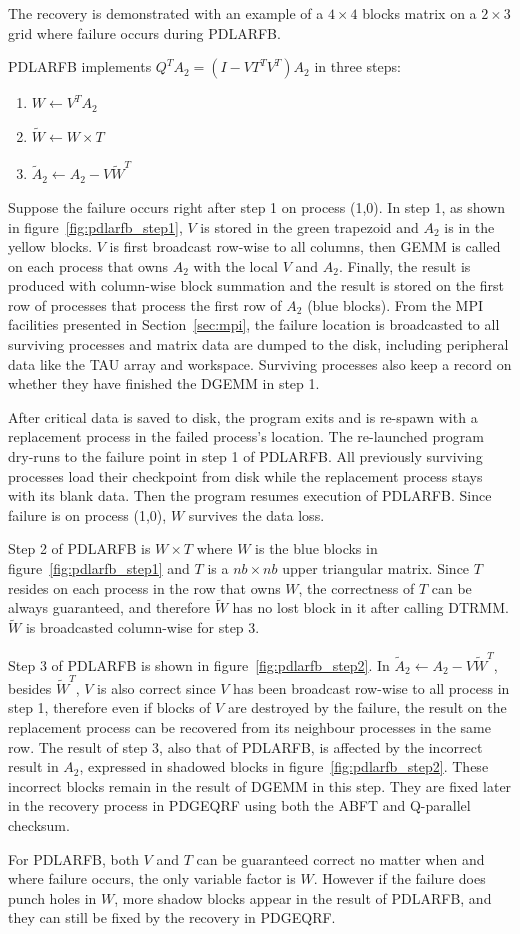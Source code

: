 The recovery is demonstrated with an example of a $4\times 4$ blocks
matrix on a $2\times 3$ grid where failure occurs during PDLARFB.

PDLARFB implements $Q^{T}A_{2}=(I-VT^{T}V^{T})A_{2}$ in three steps:
\begin{enumerate}
\item $W\leftarrow V^{T}A_{2}$
\item $\tilde{W}\leftarrow W\times T$
\item $\tilde{A}_{2}\leftarrow A_{2}-V\tilde{W}^{T}$
\end{enumerate}
Suppose the failure occurs right after step 1 on process (1,0). 
In step 1, as shown in figure~\ref{fig:pdlarfb_step1}, $V$ is stored
in the green trapezoid and $A_{2}$ is in the yellow blocks. $V$ is
first broadcast row-wise to all columns, then GEMM is called on each
process that owns $A_{2}$ with the local $V$ and $A_{2}$. Finally, the
result is produced with column-wise block summation and the result is
stored on the first row of processes that process the first row of
$A_{2}$ (blue blocks).  From the MPI facilities presented in
Section~\ref{sec:mpi}, the failure location is broadcasted to all 
surviving processes and matrix data are dumped to the disk, including
peripheral data like the TAU array and workspace. Surviving processes
also keep a record on whether they have finished the DGEMM in step 1.

After critical data is saved to disk, the program exits and is
re-spawn with a replacement process in the failed process's
location. The re-launched program dry-runs to the failure point in
step 1 of PDLARFB. All previously surviving processes load their
checkpoint from disk while the replacement process stays with its
blank data. Then the program resumes execution of PDLARFB. Since
failure is on process (1,0), $W$ survives the data loss.

Step 2 of PDLARFB is $W\times T$ where $W$ is the blue blocks in
figure~\ref{fig:pdlarfb_step1} and $T$ is a $nb\times nb$ upper
triangular matrix.  Since $T$ resides on each process in the row that
owns $W$, the correctness of $T$ can be always guaranteed, and
therefore $\tilde{W}$ has no lost block in it after calling
DTRMM. $\tilde{W}$ is broadcasted column-wise for step 3.

Step 3 of PDLARFB is shown in figure~\ref{fig:pdlarfb_step2}. In
$\tilde{A}_{2}\leftarrow A_{2}-V\tilde{W}^{T}$, besides
$\tilde{W}^{T}$, $V$ is also correct since $V$ has been broadcast
row-wise to all process in step 1, therefore even if blocks of $V$ are
destroyed by the failure, the result on the replacement process can be
recovered from its neighbour processes in the same row. The result of
step 3, also that of PDLARFB, is affected by the incorrect result in
$A_{2}$, expressed in shadowed blocks in
figure~\ref{fig:pdlarfb_step2}. These incorrect blocks remain in the
result of DGEMM in this step. They are fixed later in the recovery process
in PDGEQRF using both the ABFT and Q-parallel checksum.

For PDLARFB, both $V$ and $T$ can be guaranteed correct no matter when
and where failure occurs, the only variable factor is $W$. However if
the failure does punch holes in $W$, more shadow blocks appear in
the result of PDLARFB, and they can still be fixed by the recovery in
PDGEQRF.
